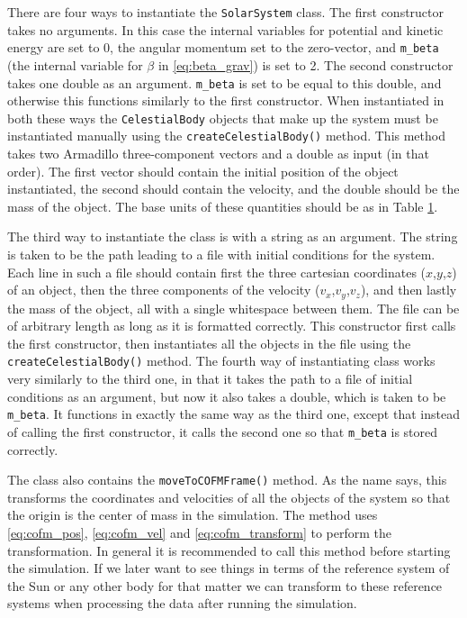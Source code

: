 \documentclass[reprint,english,notitlepage]{revtex4-1}  %
\begin{document}
There are four ways to instantiate the \verb+SolarSystem+ class. The first constructor takes no arguments. In this case the internal variables for potential and kinetic energy are set to 0, the angular momentum set to the zero-vector, and \verb+m_beta+ (the internal variable for $\beta$ in \eqref{eq:beta_grav}) is set to 2. The second constructor takes one double as an argument. \verb+m_beta+ is set to be equal to this double, and otherwise this functions similarly to the first constructor. When instantiated in both these ways the \verb+CelestialBody+ objects that make up the system must be instantiated manually using the \verb+createCelestialBody()+ method. This method takes two Armadillo \citep{Armadillo} three-component vectors and a double as input (in that order). The first vector should contain the initial position of the object instantiated, the second should contain the velocity, and the double should be the mass of the object. The base units of these quantities should be as in Table \hyperref[table:III:a:i]{1}. \newline

\label{poi:initfile}
The third way to instantiate the class is with a string as an argument. The string is taken to be the path leading to a file with initial conditions for the system. Each line in such a file should contain first the three cartesian coordinates ($x$,$y$,$z$) of an object, then the three components of the velocity ($v_x$,$v_y$,$v_z$), and then  lastly the mass of the object, all with a single whitespace between them. The file can be of arbitrary length as long as it is formatted correctly. This constructor first calls the first constructor, then instantiates all the objects in the file using the \verb+createCelestialBody()+ method. The fourth way of instantiating class works very similarly to the third one, in that it takes the path to a file of initial conditions as an argument, but now it also takes a double, which is taken to be \verb+m_beta+. It functions in exactly the same way as the third one, except that instead of calling the first constructor, it calls the second one so that \verb+m_beta+ is stored correctly.

The class also contains the \verb+moveToCOFMFrame()+ method. As the name says, this transforms the coordinates and velocities of all the objects of the system so that the origin is the center of mass in the simulation. The method uses \eqref{eq:cofm_pos}, \eqref{eq:cofm_vel} and \eqref{eq:cofm_transform} to perform the transformation. In general it is recommended to call this method before starting the simulation. If we later want to see things in terms of the reference system of the Sun or any other body for that matter we can transform to these reference systems when processing the data after running the simulation.
\end{document}
